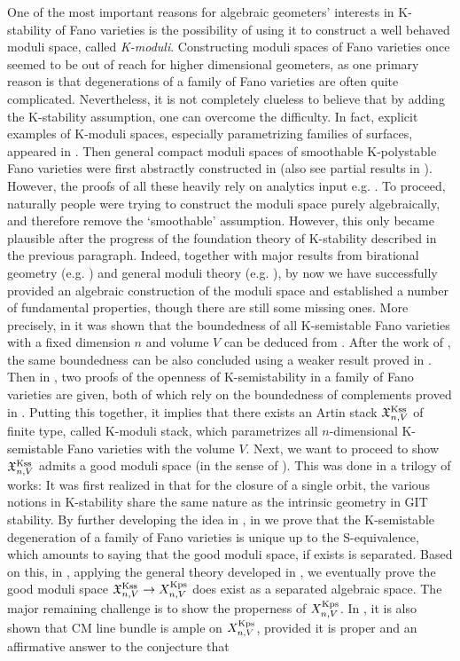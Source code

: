 \documentclass[12pt,reqno]{amsart}%
\theoremstyle{definition}
\theoremstyle{remark}
\begin{document}
One of the most important reasons for algebraic geometers' interests in K-stability of Fano varieties is the possibility of using it to construct a well behaved moduli space, called {\it K-moduli}. 
Constructing moduli spaces of Fano varieties once seemed to be out of reach for higher dimensional geometers, as one primary reason is that degenerations of a family of Fano varieties are often quite complicated. Nevertheless,  it is not completely clueless to believe that by adding the K-stability assumption, one can overcome the difficulty. In fact, explicit examples of K-moduli spaces, especially parametrizing families of surfaces, appeared in \cite{Tia90, MM93, OSS16}.  Then general compact moduli spaces of smoothable K-polystable Fano varieties were first abstractly constructed in \cite{LWX19} (also see partial results in \cite{SSY16, Oda15}). However, the proofs of all these heavily rely on analytics input e.g.  \cites{DS14, CDS,Tia15}. To proceed, naturally people were trying to construct the moduli space purely algebraically, and therefore remove the `smoothable' assumption. However, this only became plausible after the progress of the foundation theory of K-stability described in the previous paragraph. Indeed,  together with major results from birational geometry (e.g. \cite{BCHM10, HMX14, Bir19}) and general moduli theory (e.g. \cite{AHH18}), by now we have successfully provided an algebraic construction of the moduli space and established a number of fundamental properties, though there are still some missing ones. More precisely, in \cite{Jia17} it was shown that the boundedness of all K-semistable Fano varieties with a fixed dimension $n$ and volume $V$ can be deduced from \cite{Bir19}. After the work of \cite{XZ20}, the same boundedness can be also concluded using a weaker result proved in \cite{HMX14}. Then in \cite{BLX19, Xu19}, two proofs of the openness of K-semistability in a family of Fano varieties  are given, both of which rely on the boundedness of complements proved in \cite{Bir19}. Putting this together, it implies that there exists an Artin stack $\mathfrak{X}^{\rm Kss}_{n,V}$ of finite type, called K-moduli stack, which parametrizes all $n$-dimensional K-semistable Fano varieties with the volume $V$. Next, we want to proceed to show $\mathfrak{X}^{\rm Kss}_{n,V}$ admits a good moduli space (in the sense of \cite{Alp13}). This was done in a trilogy of works: It was first realized in \cite{LWX18} that  for the closure of a single orbit, the various notions in K-stability share the same nature as the intrinsic geometry in GIT stability.  By further developing the idea in \cite{LWX18}, in \cite{BX19} we prove that the K-semistable degeneration of a family of Fano varieties is unique up to the S-equivalence, which amounts to saying that the good moduli space, if exists is separated. Based on this, in \cite{ABHX19}, applying the general theory developed in \cite{AHH18}, we eventually prove the good moduli space $\mathfrak{X}^{\rm Kss}_{n,V}\to {X}^{\rm Kps}_{n,V}$ does exist as a separated algebraic space. The major remaining challenge is to show the properness of ${X}^{\rm Kps}_{n,V}$. In \cite{CP18, XZ19}, it is also shown that CM line bundle is ample on ${X}^{\rm Kps}_{n,V}$, provided it is proper and an affirmative answer to the conjecture that 
\end{document}
